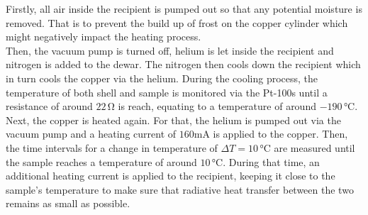 Firstly, all air inside the recipient is pumped out so that any potential moisture is removed. That is to prevent the build up of frost on the copper cylinder which might negatively impact the heating process. \\
Then, the vacuum pump is turned off, helium is let inside the recipient and nitrogen is added to the dewar.
The nitrogen then cools down the recipient which in turn cools the copper via the helium.
During the cooling process, the temperature of both shell and sample is monitored via the Pt-100s until a resistance of around $22 \,\si{\ohm}$ is reach, equating to a temperature of around $-190 \,\si{\celsius}$. \\

Next, the copper is heated again. For that, the helium is pumped out via the vacuum pump and a heating current of $160 \si{\milli\ampere}$ is applied to the copper.
Then, the time intervals for a change in temperature of $\Delta T = 10 \,\si{\celsius}$ are measured until the sample reaches a temperature of around $10 \,\si{\celsius}$.
During that time, an additional heating current is applied to the recipient, keeping it close to the sample's temperature to make sure that radiative heat transfer between the two remains as small as possible.